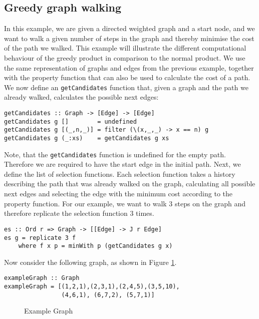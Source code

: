 \documentclass[runningheads]{llncs}
\begin{document}
\subsection{Greedy graph walking}
\label{GreedyGraphExample}
In this example, we are given a directed weighted graph and a start node, and we want to walk a given number of steps in the graph and thereby minimise the cost of the path we walked. This example will illustrate the different computational behaviour of the greedy product in comparison to the normal product. 
We use the same representation of graphs and edges from the previous example, together with the property function that can also be used to calculate the cost of a path.
We now define an \texttt{getCandidates} function that, given a graph and the path we already walked, calculates the possible next edges:
\begin{verbatim}
getCandidates :: Graph -> [Edge] -> [Edge]
getCandidates g []        = undefined
getCandidates g [(_,n,_)] = filter (\(x,_,_) -> x == n) g
getCandidates g (_:xs)    = getCandidates g xs
\end{verbatim}
Note, that the \texttt{getCandidates} function is undefined for the empty path. Therefore we are required to have the start edge in the initial path.
Next, we define the list of selection functions. Each selection function takes a history describing the path that was already walked on the graph, calculating all possible next edges and selecting the edge with the minimum cost according to the property function. For our example, we want to walk 3 steps on the graph and therefore replicate the selection function 3 times.
\begin{verbatim}
es :: Ord r => Graph -> [[Edge] -> J r Edge]
es g = replicate 3 f
    where f x p = minWith p (getCandidates g x)
\end{verbatim}
Now consider the following graph, as shown in Figure \ref{fig:exampleGraph}.
\begin{verbatim}
exampleGraph :: Graph
exampleGraph = [(1,2,1),(2,3,1),(2,4,5),(3,5,10),
                (4,6,1), (6,7,2), (5,7,1)]
\end{verbatim}
\begin{figure}[!ht]
\centering
    
    \label{Examples2}
    \caption{Example Graph}
    \label{fig:exampleGraph}
\end{figure}
\end{document}
